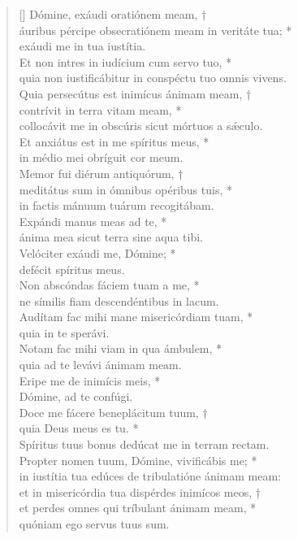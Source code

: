 \begin{verse}[\versewidth]
Dómine, exáudi oratiónem meam, †\\
áuribus pércipe obsecratiónem meam in veritáte tua; *\\
exáudi me in tua iustítia.\\
\vin Et non intres in iudícium cum servo tuo, *\\
\vin quia non iustificábitur in conspéctu tuo omnis vivens.\\
Quia persecútus est inimícus ánimam meam, †\\
contrívit in terra vitam meam, *\\
collocávit me in obscúris sicut mórtuos a s\'{æ}culo.\\
\vin Et anxiátus est in me spíritus meus, *\\
\vin in médio mei obríguit cor meum.\\
Memor fui diérum antiquórum, †\\
meditátus sum in ómnibus opéribus tuis, *\\
in factis mánuum tuárum recogitábam.\\
\vin Expándi manus meas ad te, *\\
\vin ánima mea sicut terra sine aqua tibi.\\
Velóciter exáudi me, Dómine; *\\
defécit spíritus meus.\\
\vin Non abscóndas fáciem tuam a me, *\\
\vin ne símilis fiam descendéntibus in lacum.\\
Audítam fac mihi mane misericórdiam tuam, *\\
quia in te sperávi.\\
\vin Notam fac mihi viam in qua ámbulem, *\\
\vin quia ad te levávi ánimam meam.\\
Eripe me de inimícis meis, *\\
Dómine, ad te confúgi.\\
\vin Doce me fácere beneplácitum tuum, †\\
\vin quia Deus meus es tu. *\\
\vin Spíritus tuus bonus dedúcat me in terram rectam.\\
Propter nomen tuum, Dómine, vivificábis me; *\\
in iustítia tua edúces de tribulatióne ánimam meam:\\
\vin et in misericórdia tua dispérdes inimícos meos, †\\
\vin et perdes omnes qui tríbulant ánimam meam, *\\
\vin quóniam ego servus tuus sum.\\
\end{verse}
\vspace{1cm}


